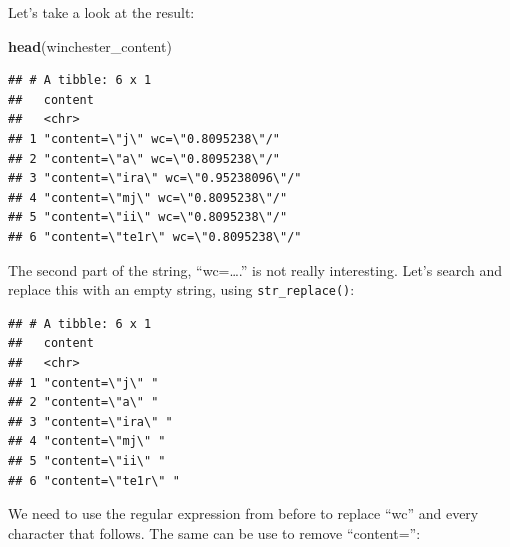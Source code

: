 \documentclass[]{gitbook}
\newenvironment{Shaded}{\begin{snugshade}}{\end{snugshade}}
\newcommand{\DataTypeTok}[1]{\textcolor[rgb]{0.13,0.29,0.53}{#1}}
\newcommand{\KeywordTok}[1]{\textcolor[rgb]{0.13,0.29,0.53}{\textbf{#1}}}
\newcommand{\NormalTok}[1]{#1}
\newcommand{\OperatorTok}[1]{\textcolor[rgb]{0.81,0.36,0.00}{\textbf{#1}}}
\newcommand{\StringTok}[1]{\textcolor[rgb]{0.31,0.60,0.02}{#1}}
\begin{document}
Let's take a look at the result:

\begin{Shaded}
\begin{Highlighting}[]
\KeywordTok{head}\NormalTok{(winchester_content)}
\end{Highlighting}
\end{Shaded}

\begin{verbatim}
## # A tibble: 6 x 1
##   content                             
##   <chr>                               
## 1 "content=\"j\" wc=\"0.8095238\"/"   
## 2 "content=\"a\" wc=\"0.8095238\"/"   
## 3 "content=\"ira\" wc=\"0.95238096\"/"
## 4 "content=\"mj\" wc=\"0.8095238\"/"  
## 5 "content=\"ii\" wc=\"0.8095238\"/"  
## 6 "content=\"te1r\" wc=\"0.8095238\"/"
\end{verbatim}

The second part of the string, ``wc=\ldots.'' is not really interesting. Let's search and replace this
with an empty string, using \texttt{str\_replace()}:

\begin{Shaded}
\end{Shaded}

\begin{verbatim}
## # A tibble: 6 x 1
##   content            
##   <chr>              
## 1 "content=\"j\" "   
## 2 "content=\"a\" "   
## 3 "content=\"ira\" " 
## 4 "content=\"mj\" "  
## 5 "content=\"ii\" "  
## 6 "content=\"te1r\" "
\end{verbatim}

We need to use the regular expression from before to replace ``wc'' and every character that follows.
The same can be use to remove ``content='':

\begin{Shaded}
\end{Shaded}
\end{document}
